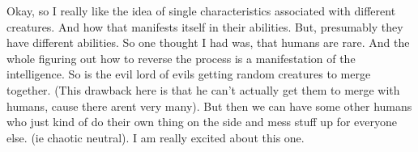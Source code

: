 \R Okay, so I really like the idea of single characteristics associated with
different creatures. And how that manifests itself in their abilities. But,
presumably they have different abilities. So one thought I had was, that humans
are rare. And the whole figuring out how to reverse the process is a
manifestation of the intelligence. So is the evil lord of evils getting random
creatures to merge together. (This drawback here is that he can’t actually get
them to merge with humans, cause there arent very many). But then we can have
some other humans who just kind of do their own thing on the side and mess stuff
up for everyone else. (ie chaotic neutral). I am really excited about this one. 


